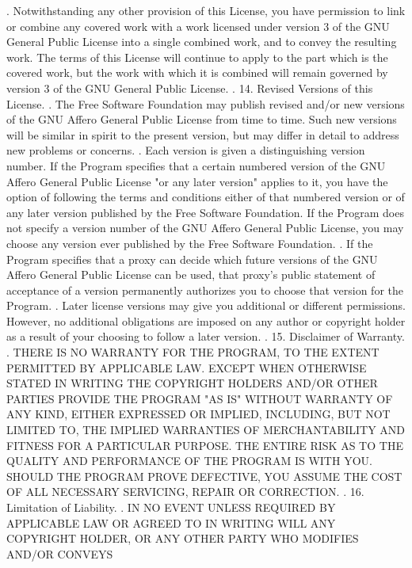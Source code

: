 \begin{script}
 .
   Notwithstanding any other provision of this License, you have
 permission to link or combine any covered work with a work licensed
 under version 3 of the GNU General Public License into a single
 combined work, and to convey the resulting work.  The terms of this
 License will continue to apply to the part which is the covered work,
 but the work with which it is combined will remain governed by version
 3 of the GNU General Public License.
 .
   14. Revised Versions of this License.
 .
   The Free Software Foundation may publish revised and/or new versions of
 the GNU Affero General Public License from time to time.  Such new versions
 will be similar in spirit to the present version, but may differ in detail to
 address new problems or concerns.
 .
   Each version is given a distinguishing version number.  If the
 Program specifies that a certain numbered version of the GNU Affero General
 Public License "or any later version" applies to it, you have the
 option of following the terms and conditions either of that numbered
 version or of any later version published by the Free Software
 Foundation.  If the Program does not specify a version number of the
 GNU Affero General Public License, you may choose any version ever published
 by the Free Software Foundation.
 .
   If the Program specifies that a proxy can decide which future
 versions of the GNU Affero General Public License can be used, that proxy's
 public statement of acceptance of a version permanently authorizes you
 to choose that version for the Program.
 .
   Later license versions may give you additional or different
 permissions.  However, no additional obligations are imposed on any
 author or copyright holder as a result of your choosing to follow a
 later version.
 .
   15. Disclaimer of Warranty.
 .
   THERE IS NO WARRANTY FOR THE PROGRAM, TO THE EXTENT PERMITTED BY
 APPLICABLE LAW.  EXCEPT WHEN OTHERWISE STATED IN WRITING THE COPYRIGHT
 HOLDERS AND/OR OTHER PARTIES PROVIDE THE PROGRAM "AS IS" WITHOUT WARRANTY
 OF ANY KIND, EITHER EXPRESSED OR IMPLIED, INCLUDING, BUT NOT LIMITED TO,
 THE IMPLIED WARRANTIES OF MERCHANTABILITY AND FITNESS FOR A PARTICULAR
 PURPOSE.  THE ENTIRE RISK AS TO THE QUALITY AND PERFORMANCE OF THE PROGRAM
 IS WITH YOU.  SHOULD THE PROGRAM PROVE DEFECTIVE, YOU ASSUME THE COST OF
 ALL NECESSARY SERVICING, REPAIR OR CORRECTION.
 .
   16. Limitation of Liability.
 .
   IN NO EVENT UNLESS REQUIRED BY APPLICABLE LAW OR AGREED TO IN WRITING
 WILL ANY COPYRIGHT HOLDER, OR ANY OTHER PARTY WHO MODIFIES AND/OR CONVEYS

\end{script}
